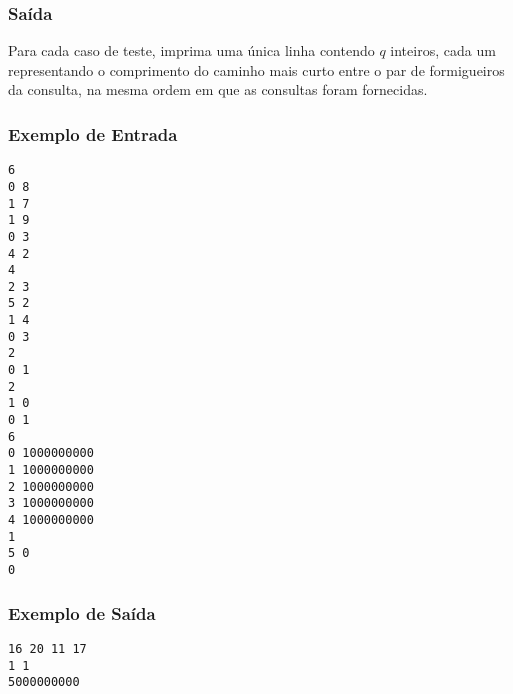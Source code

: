 \subsubsection*{Saída}
Para cada caso de teste, imprima uma única linha contendo \(q\) inteiros, cada um representando o comprimento do caminho mais curto entre o par de formigueiros da consulta, na mesma ordem em que as consultas foram fornecidas.

\subsubsection*{Exemplo de Entrada}
\begin{verbatim}
6
0 8
1 7
1 9
0 3
4 2
4
2 3
5 2
1 4
0 3
2
0 1
2
1 0
0 1
6
0 1000000000
1 1000000000
2 1000000000
3 1000000000
4 1000000000
1
5 0
0
\end{verbatim}

\subsubsection*{Exemplo de Saída}
\begin{verbatim}
16 20 11 17
1 1
5000000000
\end{verbatim}


